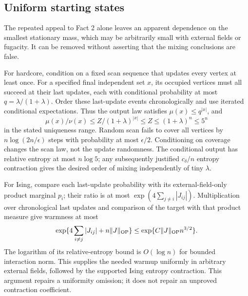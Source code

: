 \documentclass[10pt]{article}
\begin{document}
\subsection*{Uniform starting states}
The repeated appeal to Fact 2 alone leaves an apparent dependence on the smallest stationary mass, which may be arbitrarily small with external fields or fugacity. It can be removed without asserting that the mixing conclusions are false.\par
For hardcore, condition on a fixed scan sequence that updates every vertex at least once. For a specified final independent set \(x\), its occupied vertices must all succeed at their last updates, each with conditional probability at most \(q=\lambda/(1+\lambda)\). Order these last-update events chronologically and use iterated conditional expectations. Thus the output law satisfies \(\mu(x)\le q^{|x|}\), and \[\mu(x)/\nu(x)\le Z/(1+\lambda)^{|x|}
       \le Z\le(1+\lambda)^n\le5^n\] in the stated uniqueness range. Random scan fails to cover all vertices by \(n\log(2n/\epsilon)\) steps with probability at most \(\epsilon/2\). Conditioning on coverage changes the scan law, not the update randomness. The conditional output has relative entropy at most \(n\log5\); any subsequently justified \(c_\delta/n\) entropy contraction gives the desired order of mixing independently of tiny \(\lambda\).\par
For Ising, compare each last-update probability with its external-field-only product marginal \(p_i\); their ratio is at most \(\exp(4\sum_{j\ne i}|J_{ij}|)\). Multiplication over chronological last updates and comparison of the target with that product measure give warmness at most \[\exp\{4\sum_{i\ne j}|J_{ij}|+n\|J\|_{\rm OP}\}
       \le\exp\{C\|J\|_{\rm OP}n^{3/2}\}.\] The logarithm of its relative-entropy bound is \(O(\log n)\) for bounded interaction norm. This supplies the needed warmup uniformly in arbitrary external fields, followed by the supported Ising entropy contraction. This argument repairs a uniformity omission; it does not repair an unproved contraction coefficient.\par
\end{document}
